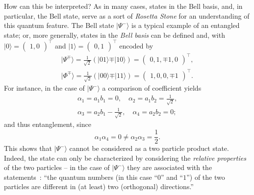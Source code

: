 \documentclass{ws-book9x6}
\begin{document}
How can this be interpreted?
As in many cases, states in the Bell basis, and, in particular, the Bell state,
serve as a sort of
{\em Rosetta Stone}
for an understanding of this quantum feature.
The  Bell state
$\vert \Psi^- \rangle$ is a typical example of an entangled state;
or, more generally, states in the
{\em Bell basis}
 can be defined and,
with
$\vert  0 \rangle =  \begin{pmatrix}1,0\end{pmatrix}^\intercal$
and
$\vert  1 \rangle =  \begin{pmatrix}0,1\end{pmatrix}^\intercal$
  encoded by
\begin{equation}
\begin{split}
\vert \Psi^\mp \rangle = \frac{1}{\sqrt{2}}\left(\vert 0   1 \rangle \mp \vert 1   0 \rangle  \right)= \begin{pmatrix} 0, 1, \mp 1, 0\end{pmatrix}^\intercal ,  \\
\vert \Phi^\mp \rangle = \frac{1}{\sqrt{2}}\left(\vert 0   0 \rangle \mp \vert 1   1 \rangle  \right)= \begin{pmatrix} 1, 0, 0, \mp 1\end{pmatrix}^\intercal  .
\end{split}
\label{2014-m-ch-fdvs-bellbasis2}
\end{equation}
For instance, in the case of $\vert \Psi^- \rangle$ a comparison of coefficient yields
\begin{equation}
\begin{split}
\alpha_1=a_1b_1=0, \quad
\alpha_2=a_1b_2=\frac{1}{\sqrt{2}},\\
\alpha_3=a_2b_1-\frac{1}{\sqrt{2}}, \quad
\alpha_4=a_2b_2=0;
\end{split}
\label{2012-m-ch-fdvs-BellSCC}
\end{equation}
and thus
entanglement, since
\begin{equation}
{\alpha_1}{\alpha_4}=0 \neq {\alpha_2}{\alpha_3}=\frac{1}{2}.
\end{equation}
This shows that  $\vert \Psi^- \rangle$ cannot be considered as a two particle product state.
Indeed, the state can only be characterized by considering the {\em relative properties}
of the two particles --
in the case of  $\vert \Psi^- \rangle$ they are associated with the statements~\cite{zeil-99}:
``the quantum numbers (in this case ``$0$'' and ``$1$'') of the two particles are different in (at least)
two (orthogonal) directions.''
\end{document}
